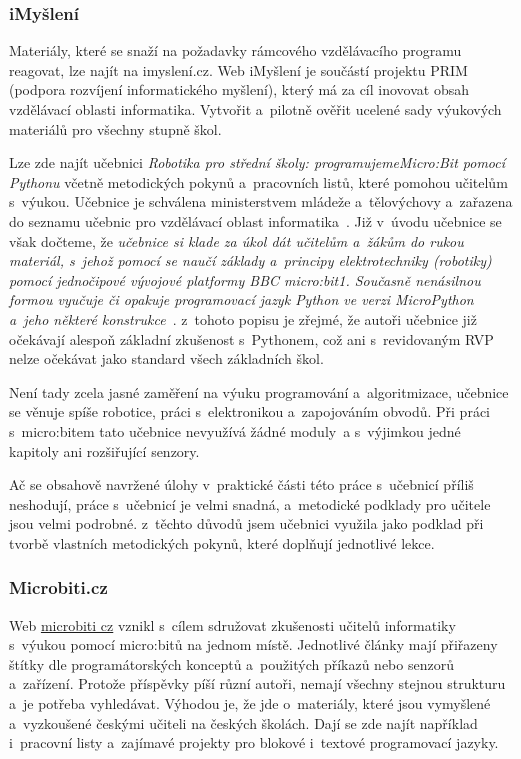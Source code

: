 \documentclass[
  digital,     %
  oneside,     %
  nosansbold,  %
  colorbold, %
  lof,         %
  nolot,         %
]{fithesis4}
\begin{document}
\subsubsection{iMyšlení}
Materiály, které se snaží na požadavky rámcového vzdělávacího programu reagovat, lze najít na imyslení.cz. Web iMyšlení je součástí projektu PRIM (podpora rozvíjení informatického myšlení), který má za cíl inovovat obsah vzdělávací oblasti informatika. Vytvořit a~pilotně ověřit ucelené sady výukových materiálů pro všechny stupně škol. 

Lze zde najít učebnici \textit{Robotika pro střední školy: programujeme\break Micro:Bit pomocí Pythonu} včetně metodických pokynů a~pracovních listů, které pomohou učitelům s~výukou. Učebnice je schválena ministerstvem mládeže a~tělovýchovy a~zařazena do seznamu učebnic pro vzdělávací oblast informatika~\cite{Summerfield10}. Již v~úvodu učebnice se však dočteme, že \textit{učebnice si klade za úkol dát učitelům a~žákům do rukou materiál, s~jehož pomocí se naučí základy a~principy elektrotechniky (robotiky) pomocí jednočipové vývojové platformy BBC micro:bit1. Současně nenásilnou formou vyučuje či opakuje programovací jazyk Python ve verzi MicroPython a~jeho některé konstrukce}~\cite{pythonImysleni}. z~tohoto popisu je zřejmé, že autoři učebnice již očekávají alespoň základní zkušenost s~Pythonem, což ani s~revidovaným RVP nelze očekávat jako standard všech základních škol. 

Není tady zcela jasné zaměření na výuku programování a~algoritmizace, učebnice se věnuje spíše robotice, práci s~elektronikou a~zapojováním obvodů. Při práci s~micro:bitem tato učebnice nevyužívá žádné moduly~a s~výjimkou jedné kapitoly ani rozšiřující senzory. 

Ač se obsahově navržené úlohy v~praktické části této práce s~učebnicí příliš neshodují, práce s~učebnicí je velmi snadná, a~metodické podklady pro učitele jsou velmi podrobné. z~těchto důvodů jsem učebnici využila jako podklad při tvorbě vlastních metodických pokynů, které doplňují jednotlivé lekce.

\subsubsection{Microbiti.cz}
Web \href{microbiti.cz}{microbiti cz} vznikl s~cílem sdružovat zkušenosti učitelů informatiky s~výukou pomocí micro:bitů na jednom místě. Jednotlivé články mají přiřazeny štítky dle programátorských konceptů a~použitých příkazů nebo senzorů a~zařízení. Protože příspěvky píší různí autoři, nemají všechny stejnou strukturu a~je potřeba vyhledávat. Výhodou je, že jde o~materiály, které jsou vymyšlené a~vyzkoušené českými učiteli na českých školách. Dají se zde najít například i~pracovní listy a~zajímavé projekty pro blokové i~textové programovací jazyky.
\end{document}
